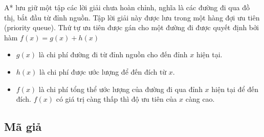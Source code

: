 \hspace{0.42cm} A* lưu giữ một tập các lời giải chưa hoàn chỉnh, nghĩa là các đường đi qua đồ thị, bắt đầu từ đỉnh nguồn. Tập lời giải này được lưu trong một hàng đợi ưu tiên (priority queue). Thứ tự ưu tiên được gán cho một đường đi được quyết định bởi hàm $f(x) = g(x) + h(x)$
\begin{itemize}
    \item $g(x)$ là chi phí đường đi từ đỉnh nguồn cho đến đỉnh $x$ hiện tại.
    \item $h(x)$ là chi phí được ước lượng để đến đích từ $x$.
    \item $f(x)$ là chi phí tổng thể ước lượng của đường đi qua đỉnh $x$ hiện tại để đến đích. $f(x)$ có giá trị càng thấp thì độ ưu tiên của $x$ càng cao.
\end{itemize}
\hspace{0.42cm} 

\subsection{Mã giả}


